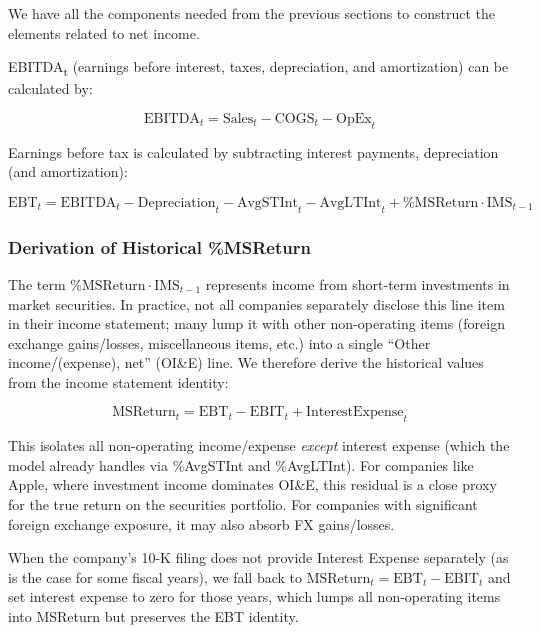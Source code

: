 \documentclass[12pt,a4paper]{article}
\begin{document}
We have all the components needed from the previous sections to
construct the elements related to net income.

EBITDA\textsubscript{t} (earnings before interest, taxes, depreciation,
and amortization) can be calculated by:

\begin{equation}\label{eq:ebitda}
\text{EBITDA}_t = \text{Sales}_t - \text{COGS}_t - \text{OpEx}_t
\end{equation}

Earnings before tax is calculated by subtracting interest payments,
depreciation (and amortization):

\begin{equation}\label{eq:ebt}
\text{EBT}_t = \text{EBITDA}_t - \text{Depreciation}_t - \text{AvgSTInt}_t - \text{AvgLTInt}_t + \text{\%MSReturn} \cdot \text{IMS}_{t-1}
\end{equation}

\subsubsection{Derivation of Historical \%MSReturn}

The term $\text{\%MSReturn} \cdot \text{IMS}_{t-1}$ represents income
from short-term investments in market securities.  In practice, not all
companies separately disclose this line item in their income statement;
many lump it with other non-operating items (foreign exchange
gains/losses, miscellaneous items, etc.) into a single ``Other
income/(expense), net'' (OI\&E) line.  We therefore derive the
historical values from the income statement identity:

\begin{equation}\label{eq:ms_return_derivation}
\text{MSReturn}_t = \text{EBT}_t - \text{EBIT}_t + \text{InterestExpense}_t
\end{equation}

This isolates all non-operating income/expense \emph{except} interest
expense (which the model already handles via \%AvgSTInt and \%AvgLTInt).
For companies like Apple, where investment income dominates OI\&E, this
residual is a close proxy for the true return on the securities
portfolio.  For companies with significant foreign exchange exposure, it
may also absorb FX gains/losses.

When the company's 10-K filing does not provide Interest Expense separately (as is
the case for some fiscal years), we fall back to
$\text{MSReturn}_t = \text{EBT}_t - \text{EBIT}_t$ and set
interest expense to zero for those years, which lumps all non-operating
items into MSReturn but preserves the EBT identity.
\end{document}
